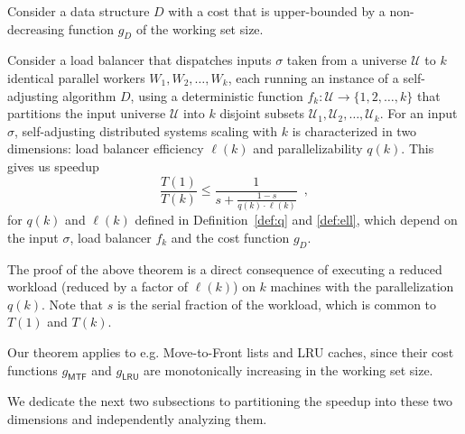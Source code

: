 \begin{theorem}
	\label{thm:superlinear}
	Consider a data structure $D$ with a cost that is upper-bounded by a non-decreasing function $g_D$ of the working set size.

	Consider a load balancer that dispatches inputs $\sigma$ taken from a universe $\mathcal{U}$ to $k$ identical parallel workers $W_1, W_2, \ldots, W_k$, each running an instance of a self-adjusting algorithm $D$, using a deterministic function $f_k : \mathcal{U} \to \{1, 2, \ldots, k\}$ that partitions the input universe $\mathcal{U}$ into $k$ disjoint subsets $\mathcal{U}_1, \mathcal{U}_2, \ldots, \mathcal{U}_k$. 
For an input $\sigma$, self-adjusting distributed systems scaling with $k$ is characterized in two dimensions: 
load balancer efficiency $\ell(k)$ and parallelizability $q(k)$.
This gives us speedup
\begin{equation*}\label{eq:mtf-perf}
  \frac{T(1)}{T(k)} \le \frac1{s + \frac{1-s}{q(k) \cdot \ell(k)}} \enspace ,
\end{equation*}
for $q(k)$ and $\ell(k)$ defined in Definition~\ref{def:q} and \ref{def:ell}, which depend on the input $\sigma$, load balancer $f_k$ and the cost function $g_D$.
\end{theorem}

The proof of the above theorem is a direct consequence of executing a reduced workload (reduced by a factor of $\ell(k)$) on $k$ machines with the parallelization $q(k)$. 
Note that $s$ is the serial fraction of the workload, which is common to $T(1)$ and $T(k)$.

Our theorem applies to e.g. Move-to-Front lists and LRU caches, since their cost functions $g_\textsf{MTF}$ and $g_\textsf{LRU}$ are monotonically increasing in the working set size.

We dedicate the next two subsections to partitioning the speedup into these two dimensions and independently analyzing them.






